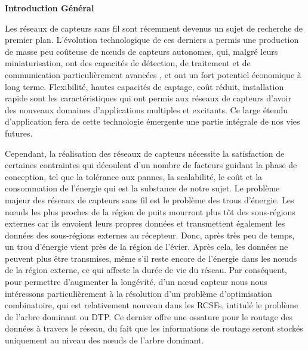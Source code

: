 

\begin{center}
	\Large\textbf{Introduction Général}
\end{center}

Les réseaux de capteurs sans fil sont récemment devenus un sujet de recherche de premier plan. L’évolution technologique de ces derniers a permis une production de masse peu coûteuse de nœuds de capteurs autonomes, qui, malgré leurs miniaturisation, ont des capacités de détection, de traitement et de communication particulièrement avancées \cite{yick2008wireless} , et ont un fort potentiel économique à long terme. Flexibilité, hautes capacités de captage, coût réduit, installation rapide sont les caractéristiques qui ont permis aux réseaux de capteurs d’avoir des nouveaux domaines d’applications multiples et excitants. Ce large étendu d’application fera de cette technologie émergente une partie intégrale de nos vies futures.


Cependant, la réalisation des réseaux de capteurs nécessite la satisfaction de certaines contraintes qui découlent d’un nombre de facteurs guidant la phase de conception, tel que la tolérance aux pannes, la scalabilité, le coût et la consommation de l’énergie qui est la substance de notre sujet.
Le problème majeur des réseaux de capteurs sans fil est le problème des trous d’énergie. Les nœuds les plus proches de la région de puits mourront plus tôt des sous-régions externes car ils envoient leurs propres données et transmettent également les données des sous-régions externes au récepteur. Donc, après très peu de temps, un trou d’énergie vient près de la région de l’évier. Après cela, les données ne peuvent plus être transmises, même s'il reste encore de l'énergie dans les nœuds de la région externe, ce qui affecte la durée de vie du réseau. Par conséquent, pour permettre d’augmenter la  longévité, d’un nœud capteur nous nous intéressons particulièrement à la résolution d’un problème d’optimisation combinatoire, qui est relativement nouveau dans les RCSFs, intitulé le problème de l’arbre dominant ou DTP.  Ce dernier offre une ossature pour le routage des données à travers le réseau, du fait que les informations de routage seront stockés uniquement au niveau des nœuds de l’arbre dominant. 


